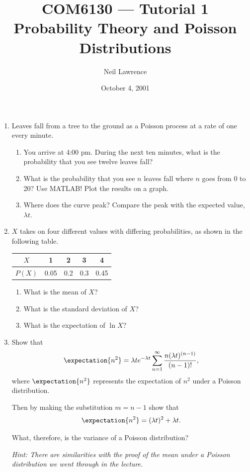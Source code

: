 \documentclass[a4paper]{article}
\title{COM6130 --- Tutorial 1\\Probability Theory and Poisson Distributions}
\author{Neil Lawrence}
\date{October 4, 2001}
\begin{document}
\maketitle
%
\begin{enumerate}

\item Leaves fall from a tree to the ground as a Poisson process at a rate of one every minute.

\begin{enumerate}
\item You arrive at 4:00 pm. During the next ten minutes, what is the probability that you see twelve leaves fall?

\item What is the probability that you see $n$ leaves fall where $n$ goes from 0 to 20? Use MATLAB! Plot the results on a graph.

\item Where does the curve peak? Compare the peak with the expected value, $\lambda t$.
\end{enumerate}

\item $X$ takes on four different values with differing probabilities, as shown in the following table.
\begin{center}
\begin{tabular}{c|cccc}
$X$ & 1 & 2 & 3 & 4 \\
\hline
$P(X)$& 0.05 & 0.2 & 0.3 & 0.45
\end{tabular}
\end{center}

\begin{enumerate}
\item What is the mean of $X$? 
\item What is the standard deviation of $X$?
\item What is the expectation of $\ln X$?
\end{enumerate}

\item Show that
\begin{equation}
\expectation{n^2} = \lambda t e^{-\lambda t} \sum_{n=1}^\infty \frac{n (\lambda t)^{(n-1)}}{(n-1)!},
\end{equation}
where $\expectation{n^2}$ represents the expectation of $n^2$ under a Poisson distribution.

Then by making the substitution $m = n - 1$ show that
\begin{equation}
\expectation{n^2} = (\lambda t)^2 + \lambda t.  
\end{equation}

What, therefore, is the variance of a Poisson distribution?

\emph{Hint: There are similarities with the proof of the mean under a Poisson distribution we went through in the lecture.}
\end{enumerate}
\end{document}
